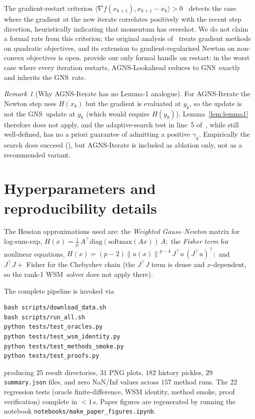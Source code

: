 \documentclass[conference]{IEEEtran}
\theoremstyle{remark}
\newtheorem{remark}[theorem]{Remark}
\newcommand{\norm}[1]{\left\lVert#1\right\rVert}
\newcommand{\AGNS}{\textsc{AGNS}}
\newcommand{\GNS}{\textsc{GNS}}
\newcommand{\WSM}{\textsc{WSM}}
\begin{document}
The gradient-restart criterion $\langle \nabla f(x_{k+1}), x_{k+1}
- x_k \rangle > 0$~\cite{odonoghue2015restart} detects the case
where the gradient at the new iterate correlates positively with the
recent step direction, heuristically indicating that momentum has
overshot. We do not claim a formal rate from this criterion; the
original analysis of~\cite{odonoghue2015restart} treats gradient
methods on quadratic objectives, and its extension to
gradient-regularised Newton on non-convex objectives is
open.  provide our only
formal handle on restart: in the worst case where every iteration
restarts, \AGNS-Lookahead reduces to \GNS\ exactly and inherits the
\GNS\ rate.

\begin{remark}[Why \AGNS-Iterate has no Lemma-1 analogue]
\label{rem:iterate}
For \AGNS-Iterate the Newton step uses $H(x_k)$ but the gradient is
evaluated at $y_k$, so the update is not the \GNS\ update at $y_k$
(which would require $H(y_k)$). Lemma~\ref{lem:lemma1} therefore does
not apply, and the adaptive-search test in line~5 of~,
while still well-defined, has no a priori guarantee of admitting a
positive $\gamma_k$. Empirically the search does succeed
(), but \AGNS-Iterate is included as
ablation only, not as a recommended variant.
\end{remark}

\section{Hyperparameters and reproducibility details}
\label{app:hyper}\label{app:repro}

The Hessian approximations used are: the \emph{Weighted
Gauss--Newton} matrix for log-sum-exp,
\(
H(x) = \tfrac{1}{\mu}\, A^\top \mathrm{diag}(\mathrm{softmax}(A x))\, A;
\)
the \emph{Fisher term} for nonlinear equations,
\(
H(x) = (p-2)\norm{u(x)}^{p-4}\, J^\top u\, (J^\top u)^\top;
\)
and $J^\top J +$ Fisher for the Chebyshev chain (the $J^\top J$ term
is dense and $x$-dependent, so the rank-1 \WSM\ solver does not apply
there).

The complete pipeline is invoked via
\begin{verbatim}
bash scripts/download_data.sh
bash scripts/run_all.sh
python tests/test_oracles.py
python tests/test_wsm_identity.py
python tests/test_methods_smoke.py
python tests/test_proofs.py
\end{verbatim}
producing $25$ result directories, $31$ PNG plots, $182$ history
pickles, $29$ \texttt{summary.json} files, and zero NaN/Inf values
across $157$ method runs. The 22 regression tests (oracle
finite-difference, WSM identity, method smoke, proof verification)
complete in $<\!1$\,s. Paper figures are regenerated by running the
notebook \texttt{notebooks/make\_paper\_figures.ipynb}.
\end{document}
